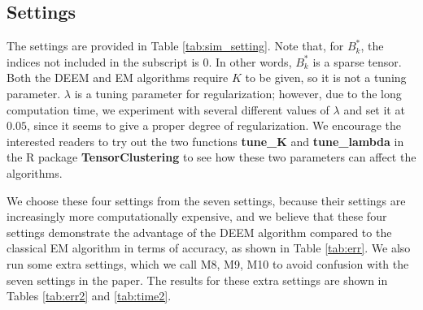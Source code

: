 \documentclass[11pt]{article}
\begin{document}
\subsection{Settings}

The settings are provided in Table \ref{tab:sim_setting}. Note that, for ${B}^*_{k}$, the indices not included in the subscript is $0$. In other words, ${B}^*_k$ is a sparse tensor. Both the DEEM and EM algorithms require $K$ to be given, so it is not a tuning parameter. $\lambda$ is a tuning parameter for regularization; however, due to the long computation time, we experiment with several different values of $\lambda$ and set it at $0.05$, since it seems to give a proper degree of regularization. We encourage the interested readers to try out the two functions \textbf{tune\_K} and \textbf{tune\_lambda} in the R package \textbf{TensorClustering} to see how these two parameters can affect the algorithms. 

We choose these four settings from the seven settings, because their settings are increasingly more computationally expensive, and we believe that these four settings demonstrate the advantage of the DEEM algorithm compared to the classical EM algorithm in terms of accuracy, as shown in Table \ref{tab:err}. We also run some extra settings, which we call M8, M9, M10 to avoid confusion with the seven settings in the paper. The results for these extra settings are shown in Tables \ref{tab:err2} and \ref{tab:time2}.
\end{document}
